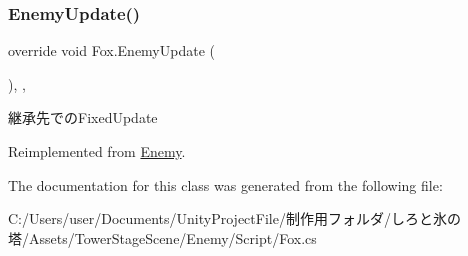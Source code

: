 \subsubsection{\texorpdfstring{Enemy\+Update()}{EnemyUpdate()}}
{\footnotesize\ttfamily override void Fox.\+Enemy\+Update (\begin{DoxyParamCaption}{ }\end{DoxyParamCaption})\hspace{0.3cm}{\ttfamily [inline]}, {\ttfamily [protected]}, {\ttfamily [virtual]}}



継承先での\+Fixed\+Update 



Reimplemented from \hyperlink{class_enemy_ab19a73003a5b443ba93f4b6a45c0abad}{Enemy}.



The documentation for this class was generated from the following file\+:\begin{DoxyCompactItemize}
\item 
C\+:/\+Users/user/\+Documents/\+Unity\+Project\+File/制作用フォルダ/しろと氷の塔/\+Assets/\+Tower\+Stage\+Scene/\+Enemy/\+Script/Fox.\+cs\end{DoxyCompactItemize}
